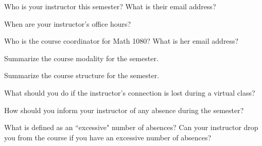\documentclass{exam}
\numberwithin{equation}{section} %
\numberwithin{figure}{section} %
\numberwithin{table}{section} %
\begin{document}
\newpage
\begin{questions}
\question Who is your instructor this semester? What is their email address?
\begin{solution}[\stretch{1}]
\end{solution}

\question When are your instructor's office hours? 
\begin{solution}[\stretch{1}]

\end{solution}

\question Who is the course coordinator for Math 1080? What is her email address?
\begin{solution}[\stretch{1}]

\end{solution}

\question Summarize the course modality for the semester.
\begin{solution}[\stretch{2}]

\end{solution}

\newpage

\question Summarize the course structure for the semester.
\begin{solution}[\stretch{2}]

\end{solution}

\question What should you do if the instructor's connection is lost during a virtual class?
\begin{solution}[\stretch{1}]

\end{solution}

\question How should you inform your instructor of any absence during the semester?
\begin{solution}[\stretch{1}]

\end{solution}

\question What is defined as an ``excessive" number of absences? Can your instructor drop you from the course if you have an excessive number of absences?
\begin{solution}[\stretch{1}]

\end{solution}

\newpage


\end{questions}
\end{document}
